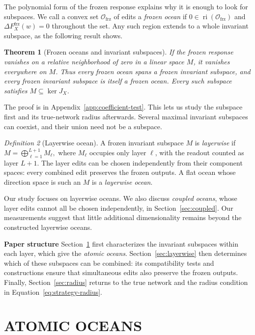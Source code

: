 \documentclass[twoside]{article}
\newtheorem{theorem}{Theorem}
\theoremstyle{remark}
\DeclareMathOperator{\ri}{ri}
\newcommand{\frz}{\mathrm{frz}}
\theoremstyle{highlightdefinition}
\newtheorem{maindefinition}[theorem]{Definition}
\theoremstyle{remark}
\begin{document}
The polynomial form of the frozen response explains why it is enough to look for subspaces. We call a convex set $\mathcal O_{\frz}$ of edits a \emph{frozen ocean} if $0\in\ri(\mathcal O_{\frz})$ and $\Delta F_X^{\frz}(w)=0$ throughout the set. Any such region extends to a whole invariant subspace, as the following result shows.
\begin{theorem}[Frozen oceans and invariant subspaces]\label{thm:correspondence}
If the frozen response vanishes on a relative neighborhood of zero in a linear space $M$, it vanishes everywhere on $M$. Thus every frozen ocean spans a frozen invariant subspace, and every frozen invariant subspace is itself a frozen ocean. Every such subspace satisfies $M\subseteq\ker J_X$.
\end{theorem}
The proof is in Appendix~\ref{app:coefficient-test}. This lets us study the subspace first and its true-network radius afterwards. Several maximal invariant subspaces can coexist, and their union need not be a subspace.

\begin{maindefinition}[Layerwise ocean]\label{def:layerwise-ocean}
A frozen invariant subspace $M$ is \emph{layerwise} if
\(
 M=\bigoplus_{\ell=1}^{L+1}M_\ell,
\)
where $M_\ell$ occupies only layer $\ell$, with the readout counted as layer $L+1$. The layer edits can be chosen independently from their component spaces: every combined edit preserves the frozen outputs. A flat ocean whose direction space is such an $M$ is a \emph{layerwise ocean}.
\end{maindefinition}


Our study focuses on layerwise oceans. We also discuss \emph{coupled oceans}, whose layer edits cannot all be chosen independently, in Section~\ref{sec:coupled}. Our measurements suggest that little additional dimensionality remains beyond the constructed layerwise oceans. 

\textbf{Paper structure}\;\;\;
Section~\ref{sec:atomic} first characterizes the invariant subspaces within each layer, which give the \emph{atomic oceans}. Section~\ref{sec:layerwise} then determines which of these subspaces can be combined: its compatibility tests and constructions ensure that simultaneous edits also preserve the frozen outputs. Finally, Section~\ref{sec:radius} returns to the true network and the radius condition in Equation~\ref{eq:strategy-radius}.

\section{ATOMIC OCEANS}
\label{sec:atomic}
\end{document}
